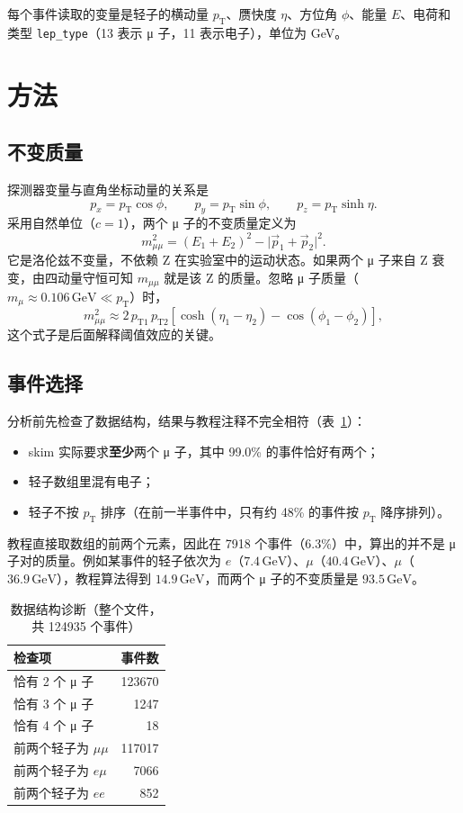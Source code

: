 \documentclass[11pt,a4paper,fontset=windows]{ctexart}
\newcommand{\pT}{p_{\mathrm{T}}}
\newcommand{\mll}{m_{\mu\mu}}
\newcommand{\GeV}{\,\mathrm{GeV}}
\begin{document}
每个事件读取的变量是轻子的横动量 $\pT$、赝快度 $\eta$、方位角 $\phi$、能量 $E$、电荷和类型 \texttt{lep\_type}（13 表示 μ 子，11 表示电子），单位为 GeV。

\section{方法}

\subsection{不变质量}

探测器变量与直角坐标动量的关系是
\begin{equation}
p_x=\pT\cos\phi,\qquad p_y=\pT\sin\phi,\qquad p_z=\pT\sinh\eta .
\end{equation}
采用自然单位（$c=1$），两个 μ 子的不变质量定义为
\begin{equation}
\mll^2=(E_1+E_2)^2-\lvert\vec p_1+\vec p_2\rvert^2 .
\end{equation}
它是洛伦兹不变量，不依赖 Z 在实验室中的运动状态。如果两个 μ 子来自 Z 衰变，由四动量守恒可知 $\mll$ 就是该 Z 的质量。忽略 μ 子质量（$m_\mu\approx0.106\GeV\ll\pT$）时，
\begin{equation}
\mll^2\approx 2\,p_{\mathrm{T}1}\,p_{\mathrm{T}2}\left[\cosh(\eta_1-\eta_2)-\cos(\phi_1-\phi_2)\right],
\label{eq:massless}
\end{equation}
这个式子是后面解释阈值效应的关键。

\subsection{事件选择}

分析前先检查了数据结构，结果与教程注释不完全相符（表~\ref{tab:diagnostics}）：
\begin{itemize}
  \item skim 实际要求\textbf{至少}两个 μ 子，其中 99.0\% 的事件恰好有两个；
  \item 轻子数组里混有电子；
  \item 轻子不按 $\pT$ 排序（在前一半事件中，只有约 48\% 的事件按 $\pT$ 降序排列）。
\end{itemize}
教程直接取数组的前两个元素，因此在 7918 个事件（6.3\%）中，算出的并不是 μ 子对的质量。例如某事件的轻子依次为 $e$（$7.4\GeV$）、$\mu$（$40.4\GeV$）、$\mu$（$36.9\GeV$），教程算法得到 $14.9\GeV$，而两个 μ 子的不变质量是 $93.5\GeV$。

\begin{table}[H]
\centering
\caption{数据结构诊断（整个文件，共 124935 个事件）}
\label{tab:diagnostics}
\begin{tabular}{lr}
\toprule
检查项 & 事件数 \\
\midrule
恰有 2 个 μ 子 & 123670 \\
恰有 3 个 μ 子 & 1247 \\
恰有 4 个 μ 子 & 18 \\
\midrule
前两个轻子为 $\mu\mu$ & 117017 \\
前两个轻子为 $e\mu$ & 7066 \\
前两个轻子为 $ee$ & 852 \\
\bottomrule
\end{tabular}
\end{table}
\end{document}

